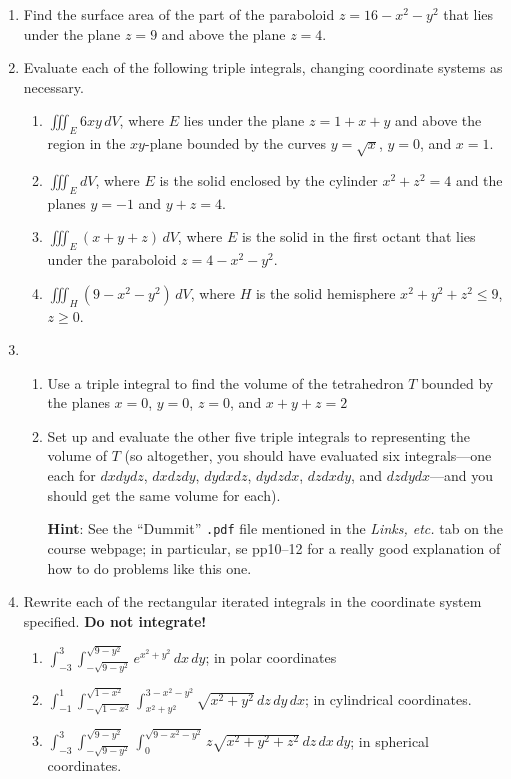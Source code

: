 \documentclass[12pt]{article}
\newcommand{\hintbf}[1]{\textbf{Hint}: #1}
\begin{document}
\begin{enumerate}
		\item Find the surface area of the part of the paraboloid $z=16-x^2-y^2$ that lies under the plane $z=9$ and above the plane $z=4$. 
		
		\item Evaluate each of the following triple integrals, changing coordinate systems as necessary.
		\begin{enumerate}
			\item $\textstyle\iiint_E 6xy\,dV$, where $E$ lies under the plane $z=1+x+y$ and above the region in the $xy$-plane bounded by the curves $y=\sqrt{x}$, $y=0$, and $x=1$.
			\item $\textstyle\iiint_E dV$, where $E$ is the solid enclosed by the cylinder $x^2+z^2=4$ and the planes $y=-1$ and $y+z=4$.
			\item $\textstyle\iiint_E(x+y+z)\,dV$, where $E$ is the solid in the first octant that lies under the paraboloid $z=4-x^2-y^2$.
			\item $\textstyle\iiint_H(9-x^2-y^2)\,dV$, where $H$ is the solid hemisphere $x^2+y^2+z^2\leq 9$, $z\geq 0$.
		\end{enumerate}
		
		\item \begin{enumerate}
			\item Use a triple integral to find the volume of the tetrahedron $T$ bounded by the planes $x=0$, $y=0$, $z=0$, and $x+y+z=2$
			\item Set up and evaluate the other five triple integrals to representing the volume of $T$ (so altogether, you should have evaluated six integrals---one each for $dxdydz$, $dxdzdy$, $dydxdz$, $dydzdx$, $dzdxdy$, and $dzdydx$---and you should get the same volume for each). 
			
			\vspace{3mm}
			\hintbf{See the ``Dummit'' \texttt{.pdf} file mentioned in the \textit{Links, etc.} tab on the course webpage; in particular, se pp10--12 for a really good explanation of how to do problems like this one.}
		\end{enumerate}
		
		\item Rewrite each of the rectangular iterated integrals in the coordinate system specified. \textbf{Do not integrate!}
		\begin{enumerate}
			\item $\int_{-3}^3\int_{-\sqrt{9-y^2}}^{\sqrt{9-y^2}}e^{x^2+y^2}\,dx\,dy$;  in polar coordinates
			\item $\int_{-1}^1 \int_{-\sqrt{1-x^2}}^{\sqrt{1-x^2}} \int_{x^2+y^2}^{3-x^2-y^2}\sqrt{x^2+y^2}\,dz\,dy\,dx$;  in cylindrical coordinates.
			\item $\int_{-3}^3 \int_{-\sqrt{9-y^2}}^{\sqrt{9-y^2}} \int_0^{\sqrt{9-x^2-y^2}}z\sqrt{x^2+y^2+z^2}\,dz\,dx\,dy$; in spherical coordinates.
		\end{enumerate}


\end{enumerate}
\end{document}

